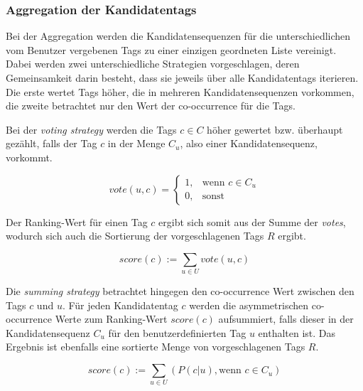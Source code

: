 \subsubsection{Aggregation der Kandidatentags} %
\label{ssub:aggregation}

Bei der Aggregation werden die Kandidatensequenzen für die unterschiedlichen vom Benutzer vergebenen Tags zu einer einzigen geordneten Liste vereinigt. Dabei werden zwei unterschiedliche Strategien vorgeschlagen, deren Gemeinsamkeit darin besteht, dass sie jeweils über alle Kandidatentags iterieren. Die erste wertet Tags höher, die in mehreren Kandidatensequenzen vorkommen, die zweite betrachtet nur den Wert der co-occurrence für die Tags. 

Bei der \emph{voting strategy} werden die Tags $c \in C$ höher gewertet bzw. überhaupt gezählt, falls der Tag $c$ in der Menge $C_u$, also einer Kandidatensequenz, vorkommt. 
\begin{figure}[hptb]
 \begin{equation}
 \label{voteAggregation}
  vote(u, c)=\begin{cases}
    1, & \text{wenn } c \in C_u\\
    0, & \text{sonst }
  \end{cases}
 \end{equation}
\end{figure}

Der Ranking-Wert für einen Tag $c$ ergibt sich somit aus der Summe der \emph{votes}, wodurch sich auch die Sortierung der vorgeschlagenen Tags $R$ ergibt.

\begin{figure}[hptb]
 \begin{equation}
 \label{voteScoreAggregation}
    score(c) := \sum_{u \in U} vote(u, c)
 \end{equation}
\end{figure}


Die \emph{summing strategy} betrachtet hingegen den co-occurrence Wert zwischen den Tags $c$ und $u$. Für jeden Kandidatentag $c$ werden die asymmetrischen co-occurrence Werte zum Ranking-Wert $score(c)$ aufsummiert, falls dieser in der Kandidatensequenz $C_u$ für den benutzerdefinierten Tag $u$ enthalten ist. Das Ergebnis ist ebenfalls eine sortierte Menge von vorgeschlagenen Tags $R$.
\begin{figure}[hptb]
 \begin{equation}
 \label{sumScoreAggregation}
    score(c) := \sum_{u \in U} (P(c \vert u), \text{wenn } c \in C_u)
 \end{equation}
\end{figure}

